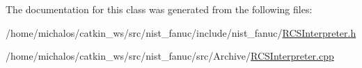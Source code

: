 The documentation for this class was generated from the following files\-:\begin{DoxyCompactItemize}
\item 
/home/michalos/catkin\-\_\-ws/src/nist\-\_\-fanuc/include/nist\-\_\-fanuc/\hyperlink{RCSInterpreter_8h}{R\-C\-S\-Interpreter.\-h}\item 
/home/michalos/catkin\-\_\-ws/src/nist\-\_\-fanuc/src/\-Archive/\hyperlink{Archive_2RCSInterpreter_8cpp}{R\-C\-S\-Interpreter.\-cpp}\end{DoxyCompactItemize}
